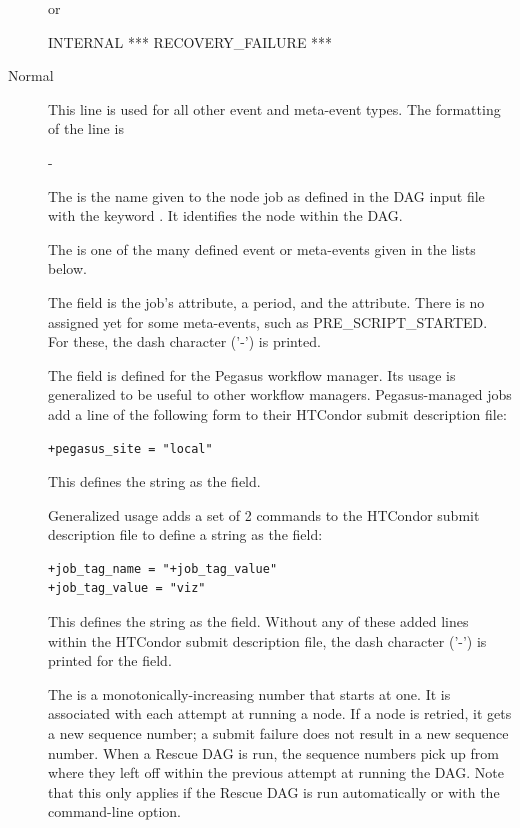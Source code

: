 \begin{description}
or

 INTERNAL *** RECOVERY\_FAILURE ***

\item [Normal]
This line is used for all other event and meta-event types.
The formatting of the line is

     - 

The  is the name given to the node job as defined in
the DAG input file with the keyword .
It identifies the node within the DAG.

The  is one of the many defined event or meta-events given
in the lists below.

The  field is the job's 
 attribute, a period, and the  attribute. 
There is no  assigned yet for some meta-events,
such as PRE\_SCRIPT\_STARTED.
For these, the dash character ('-') is printed. 

The  field is defined for the Pegasus workflow manager.
Its usage is generalized to be useful to other workflow managers.
Pegasus-managed jobs add a line of the following form to their
HTCondor submit description file:
\begin{verbatim}
+pegasus_site = "local"
\end{verbatim}
This defines the string  as the  field.
 
Generalized usage adds a set of 2 commands to the HTCondor
submit description file to define a string as the  field:
\begin{verbatim}
+job_tag_name = "+job_tag_value"
+job_tag_value = "viz"
\end{verbatim}
This defines the string  as the  field.
Without any of these added lines within the HTCondor submit description file,
the dash character ('-') is printed for the  field. 

The  is a monotonically-increasing number 
that starts at one.
It is associated with each attempt at running a node.
If a node is retried, it gets a new sequence number;
a submit failure does not result in a new sequence number.
When a Rescue DAG is run,
the sequence numbers pick up from where they left off within the previous
attempt at running the DAG.
Note that this only applies if the Rescue
DAG is run automatically or with the  command-line option.

\end{description}

